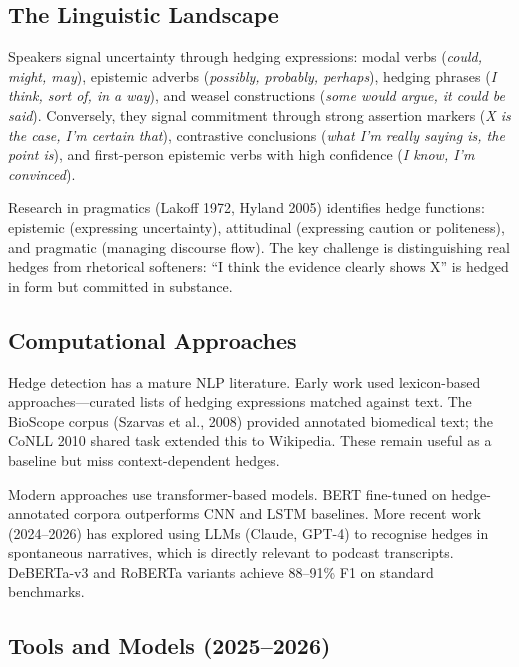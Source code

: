\documentclass[11pt,letterpaper]{article}
\begin{document}
\subsection{The Linguistic Landscape}

Speakers signal uncertainty through hedging expressions: modal verbs (\textit{could, might, may}), epistemic adverbs (\textit{possibly, probably, perhaps}), hedging phrases (\textit{I think, sort of, in a way}), and weasel constructions (\textit{some would argue, it could be said}). Conversely, they signal commitment through strong assertion markers (\textit{X is the case, I'm certain that}), contrastive conclusions (\textit{what I'm really saying is, the point is}), and first-person epistemic verbs with high confidence (\textit{I know, I'm convinced}).

Research in pragmatics (Lakoff 1972, Hyland 2005) identifies hedge functions: epistemic (expressing uncertainty), attitudinal (expressing caution or politeness), and pragmatic (managing discourse flow). The key challenge is distinguishing real hedges from rhetorical softeners: ``I think the evidence clearly shows X'' is hedged in form but committed in substance.

\subsection{Computational Approaches}

Hedge detection has a mature NLP literature. Early work used lexicon-based approaches—curated lists of hedging expressions matched against text. The BioScope corpus (Szarvas et al., 2008) provided annotated biomedical text; the CoNLL 2010 shared task extended this to Wikipedia. These remain useful as a baseline but miss context-dependent hedges.

Modern approaches use transformer-based models. BERT fine-tuned on hedge-annotated corpora outperforms CNN and LSTM baselines. More recent work (2024–2026) has explored using LLMs (Claude, GPT-4) to recognise hedges in spontaneous narratives, which is directly relevant to podcast transcripts. DeBERTa-v3 and RoBERTa variants achieve 88–91\% F1 on standard benchmarks.

\subsection{Tools and Models (2025–2026)}
\end{document}

